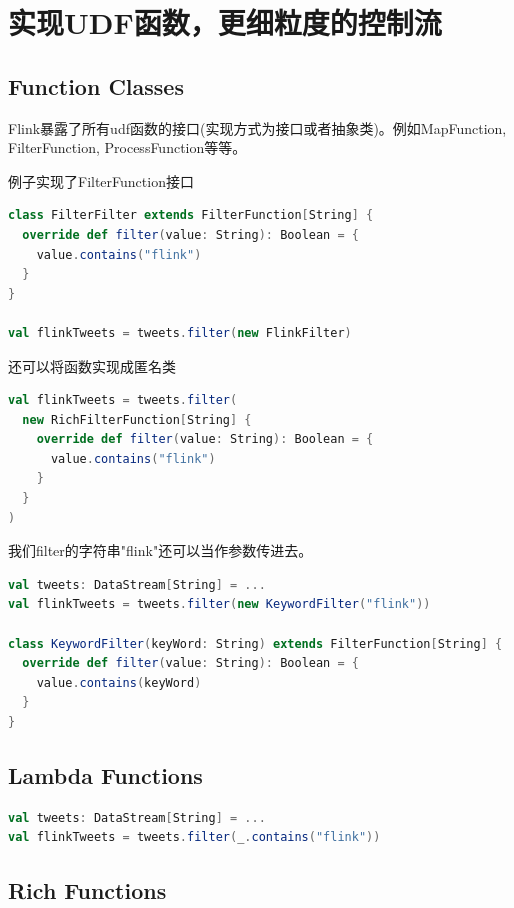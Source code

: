 \documentclass[oneside]{ctexbook}
\begin{document}
\section{实现UDF函数，更细粒度的控制流}

\subsection{Function Classes}

Flink暴露了所有udf函数的接口(实现方式为接口或者抽象类)。例如MapFunction, FilterFunction, ProcessFunction等等。

例子实现了FilterFunction接口

\begin{lstlisting}[language=scala, breaklines]
class FilterFilter extends FilterFunction[String] {
  override def filter(value: String): Boolean = {
    value.contains("flink")
  }
}

val flinkTweets = tweets.filter(new FlinkFilter)
\end{lstlisting}

还可以将函数实现成匿名类

\begin{lstlisting}[language=scala, breaklines]
val flinkTweets = tweets.filter(
  new RichFilterFunction[String] {
    override def filter(value: String): Boolean = {
      value.contains("flink")
    }
  }
)
\end{lstlisting}

我们filter的字符串"flink"还可以当作参数传进去。

\begin{lstlisting}[language=scala, breaklines]
val tweets: DataStream[String] = ...
val flinkTweets = tweets.filter(new KeywordFilter("flink"))

class KeywordFilter(keyWord: String) extends FilterFunction[String] {
  override def filter(value: String): Boolean = {
    value.contains(keyWord)
  }
}
\end{lstlisting}

\subsection{Lambda Functions}

\begin{lstlisting}[language=scala, breaklines]
val tweets: DataStream[String] = ...
val flinkTweets = tweets.filter(_.contains("flink"))
\end{lstlisting}

\subsection{Rich Functions}
\end{document}
